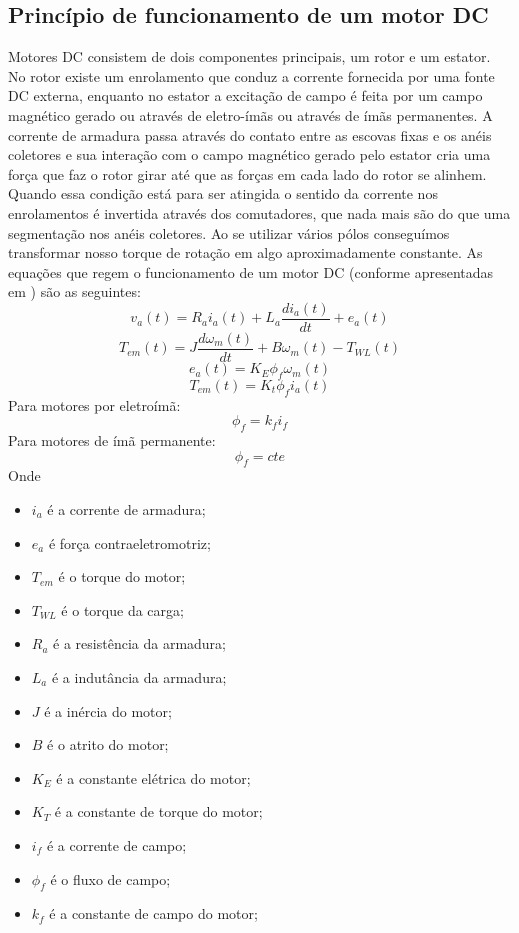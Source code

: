 \documentclass{article}
\begin{document}
\subsection{Princípio de funcionamento de um motor DC}
Motores DC consistem de dois componentes principais, um rotor e um estator. No rotor existe um enrolamento que conduz a corrente fornecida por uma fonte DC externa, enquanto no estator a excitação de campo é feita por um campo magnético gerado ou através de eletro-ímãs ou através de ímãs permanentes. A corrente de armadura passa através do contato entre as escovas fixas e os anéis coletores e sua interação com o campo magnético gerado pelo estator cria uma força que faz o rotor girar até que as forças em cada lado do rotor se alinhem. Quando essa condição está para ser atingida o sentido da corrente nos enrolamentos é invertida através dos comutadores, que nada mais são do que uma segmentação nos anéis coletores. Ao se utilizar vários pólos conseguímos transformar nosso torque de rotação em algo aproximadamente constante.
As equações que regem o funcionamento de um motor DC (conforme apresentadas em \cite{bb:mohan}) são as seguintes:
\begin{equation}
	v_a(t) = R_ai_a(t) + L_a\frac{d i_a(t)}{dt} + e_a(t)
\end{equation}
\begin{equation}
	T_{em}(t) = J \frac{d\omega_m(t)}{dt} + B\omega_m(t) - T_{WL}(t)
\end{equation}
\begin{equation}
	e_a(t) = K_E\phi_f\omega_m(t)
\end{equation}
\begin{equation}
	T_{em}(t) = K_t\phi_fi_a(t)
\end{equation}
Para motores por eletroímã:
\begin{equation}
	\phi_f = k_fi_f
\end{equation}
Para motores de ímã permanente:
\begin{equation}
	\phi_f = cte
\end{equation}
Onde
\begin{itemize}
	\item $i_a$ é a corrente de armadura;
	\item $e_a$ é força contraeletromotriz;
	\item $T_{em}$ é o torque do motor;
	\item $T_{WL}$ é o torque da carga;
	\item $R_a$ é a resistência da armadura;
	\item $L_a$ é a indutância da armadura;
	\item $J$ é a inércia do motor;
	\item $B$ é o atrito do motor;
	\item $K_E$ é a constante elétrica do motor;
	\item $K_T$ é a constante de torque do motor;
	\item $i_f$ é a corrente de campo;
	\item $\phi_f$ é o fluxo de campo;
	\item $k_f$ é a constante de campo do motor;
\end{itemize}
\end{document}
